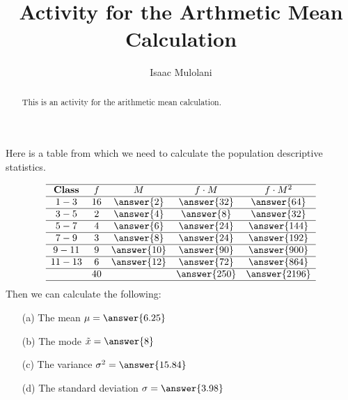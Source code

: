\documentclass{ximera}
\title{Activity for the Arthmetic Mean Calculation}
\author{Isaac Mulolani}
\begin{document}
\begin{abstract}
This is an activity for the arithmetic mean calculation.
\end{abstract}

\maketitle

\begin{question}
Here is a table from which we need to calculate the population descriptive statistics.

\[
\begin{array}{ccccc}\hline
\textbf{Class} & \textbf{$f$}   & \textbf{$M$}     & \textbf{$f\cdot M$}  & \textbf{$f\cdot M^2$} \\ \hline
1-3   & 16  & \answer{2}  & \answer{32}  & \answer{64}  \\\hline
3-5   & 2   & \answer{4}  & \answer{8}   & \answer{32}  \\\hline
5-7   & 4   & \answer{6}  & \answer{24}  & \answer{144} \\\hline
7-9   & 3   & \answer{8}  & \answer{24}  & \answer{192} \\\hline
9-11  & 9   & \answer{10} & \answer{90}  & \answer{900} \\\hline
11-13 & 6   & \answer{12} & \answer{72}  & \answer{864} \\\hline
      & 40  &             & \answer{250} & \answer{2196}\\ \hline
\end{array}
\]
Then we can calculate the following:
\begin{enumerate}
\item[(a)] The mean $\mu=\answer{6.25}$ %
\item[(b)] The mode $\tilde{x}=\answer{8}$
\item[(c)] The variance $\sigma^2=\answer{15.84}$ %
\item[(d)] The standard deviation $\sigma = \answer{3.98}$
\end{enumerate}
\end{question}
\end{document}
